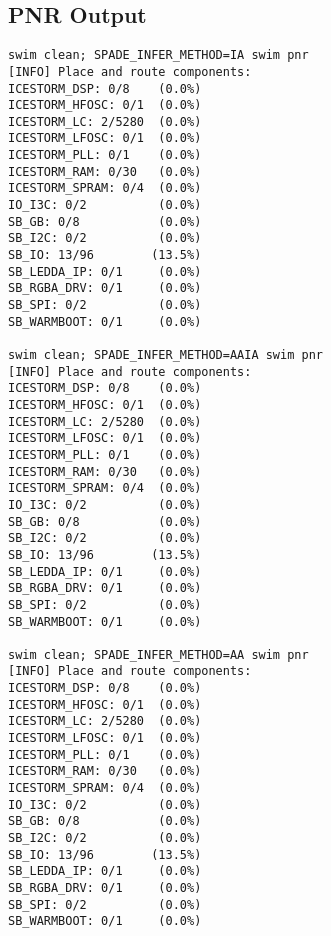 \subsection{PNR Output}
\begin{verbatim}
swim clean; SPADE_INFER_METHOD=IA swim pnr
[INFO] Place and route components:
ICESTORM_DSP: 0/8    (0.0%)
ICESTORM_HFOSC: 0/1  (0.0%)
ICESTORM_LC: 2/5280  (0.0%)
ICESTORM_LFOSC: 0/1  (0.0%)
ICESTORM_PLL: 0/1    (0.0%)
ICESTORM_RAM: 0/30   (0.0%)
ICESTORM_SPRAM: 0/4  (0.0%)
IO_I3C: 0/2          (0.0%)
SB_GB: 0/8           (0.0%)
SB_I2C: 0/2          (0.0%)
SB_IO: 13/96        (13.5%)
SB_LEDDA_IP: 0/1     (0.0%)
SB_RGBA_DRV: 0/1     (0.0%)
SB_SPI: 0/2          (0.0%)
SB_WARMBOOT: 0/1     (0.0%)

swim clean; SPADE_INFER_METHOD=AAIA swim pnr
[INFO] Place and route components:
ICESTORM_DSP: 0/8    (0.0%)
ICESTORM_HFOSC: 0/1  (0.0%)
ICESTORM_LC: 2/5280  (0.0%)
ICESTORM_LFOSC: 0/1  (0.0%)
ICESTORM_PLL: 0/1    (0.0%)
ICESTORM_RAM: 0/30   (0.0%)
ICESTORM_SPRAM: 0/4  (0.0%)
IO_I3C: 0/2          (0.0%)
SB_GB: 0/8           (0.0%)
SB_I2C: 0/2          (0.0%)
SB_IO: 13/96        (13.5%)
SB_LEDDA_IP: 0/1     (0.0%)
SB_RGBA_DRV: 0/1     (0.0%)
SB_SPI: 0/2          (0.0%)
SB_WARMBOOT: 0/1     (0.0%)

swim clean; SPADE_INFER_METHOD=AA swim pnr
[INFO] Place and route components:
ICESTORM_DSP: 0/8    (0.0%)
ICESTORM_HFOSC: 0/1  (0.0%)
ICESTORM_LC: 2/5280  (0.0%)
ICESTORM_LFOSC: 0/1  (0.0%)
ICESTORM_PLL: 0/1    (0.0%)
ICESTORM_RAM: 0/30   (0.0%)
ICESTORM_SPRAM: 0/4  (0.0%)
IO_I3C: 0/2          (0.0%)
SB_GB: 0/8           (0.0%)
SB_I2C: 0/2          (0.0%)
SB_IO: 13/96        (13.5%)
SB_LEDDA_IP: 0/1     (0.0%)
SB_RGBA_DRV: 0/1     (0.0%)
SB_SPI: 0/2          (0.0%)
SB_WARMBOOT: 0/1     (0.0%)
\end{verbatim}

